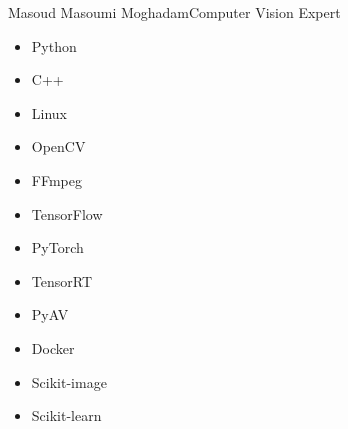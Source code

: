 \documentclass{article}
\begin{document}
\begin{cv}[avatar]{Masoud Masoumi Moghadam}{Computer Vision Expert}
\begin{itemize}
    \item Python %
    \item C++ %
    \item Linux %
    \item OpenCV %
    \item FFmpeg %
    \item TensorFlow %
    \item PyTorch %
    \item TensorRT %
    \item PyAV %
    \item Docker %
    \item Scikit-image %
    \item Scikit-learn %
\end{itemize}






\end{cv}

\end{document}

